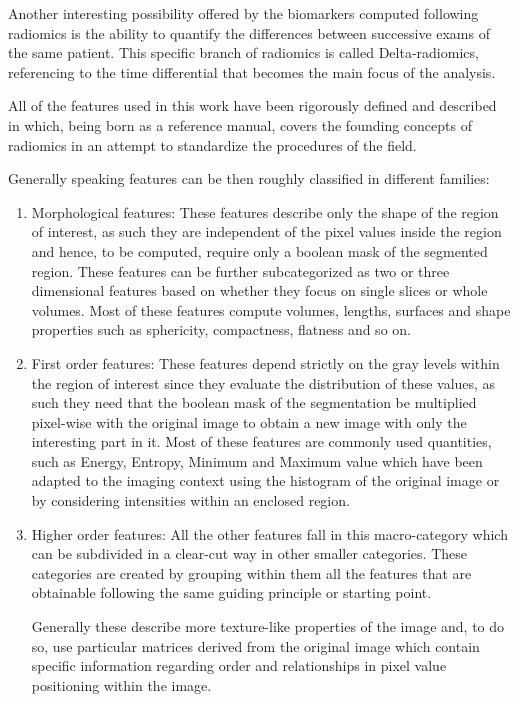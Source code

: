 Another interesting possibility offered by the biomarkers computed following radiomics is the ability to quantify the differences between successive exams of the same patient. This specific branch of radiomics is called Delta-radiomics, referencing to the time differential that becomes the main focus of the analysis.

All of the features used in this work have been rigorously defined and described in \cite{IBSI} which, being born as a reference manual, covers the founding concepts of radiomics in an attempt to standardize the procedures of the field.

Generally speaking features can be then roughly classified in different families:

\begin{enumerate}
\item Morphological features: These features describe only the shape of the region of interest, as such they are independent of the pixel values inside the region and hence, to be computed, require only a boolean mask of the segmented region. 
These features can be further subcategorized as two or three dimensional features based on whether they focus on single slices or whole volumes. Most of these features compute volumes, lengths, surfaces and shape properties such as sphericity, compactness, flatness and so on.

\item First order features: These features depend strictly on the gray levels within the region of interest since they evaluate the distribution of these values, as such they need that the boolean mask of the segmentation be multiplied pixel-wise with the original image to obtain a new image with only the interesting part in it. Most of these features are commonly used quantities, such as Energy, Entropy, Minimum and Maximum value which have been adapted to the imaging context using the histogram of the original image or by considering intensities within an enclosed region.

\item Higher order features: All the other features fall in this macro-category which can be subdivided in a clear-cut way in other smaller categories. These categories are created by grouping within them all the features that are obtainable following the same guiding principle or starting point.

Generally these describe more texture-like properties of the image and, to do so, use particular matrices derived from the original image which contain specific information regarding order and relationships in pixel value positioning within the image. 


\end{enumerate}

